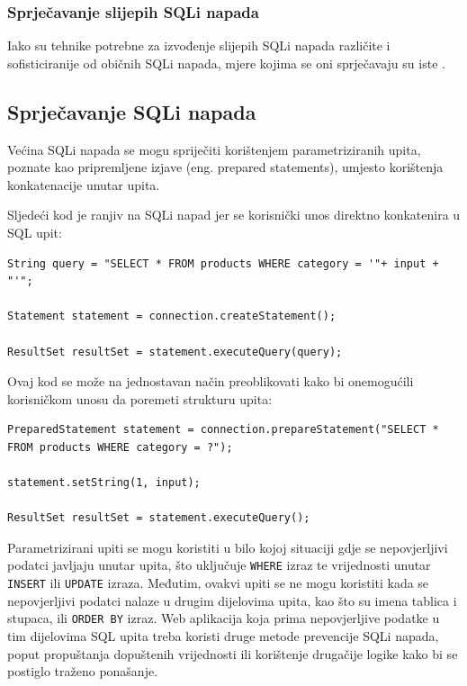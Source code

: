 \documentclass[12pt, oneside, onecolumn]{book}
\begin{document}
{\subsubsection{Sprječavanje slijepih SQLi napada}
Iako su tehnike potrebne za izvođenje slijepih SQLi napada različite i sofisticiranije od običnih SQLi napada, mjere kojima se oni sprječavaju su iste \cite{blndsqli}.

\subsection{Sprječavanje SQLi napada}
Većina SQLi napada se mogu spriječiti korištenjem parametriziranih upita, poznate kao pripremljene izjave (eng. prepared statements), umjesto korištenja konkatenacije unutar upita. 

Sljedeći kod je ranjiv na SQLi napad jer se korisnički unos direktno konkatenira u SQL upit:

\begin{verbatim}
String query = "SELECT * FROM products WHERE category = '"+ input + "'";

Statement statement = connection.createStatement();

ResultSet resultSet = statement.executeQuery(query);
\end{verbatim}

Ovaj kod se može na jednostavan način preoblikovati kako bi onemogućili korisničkom unosu da poremeti strukturu upita:

\begin{verbatim}
PreparedStatement statement = connection.prepareStatement("SELECT * FROM products WHERE category = ?");

statement.setString(1, input);

ResultSet resultSet = statement.executeQuery();
\end{verbatim}

Parametrizirani upiti se mogu koristiti u bilo kojoj situaciji gdje se nepovjerljivi podatci javljaju unutar upita, što uključuje \texttt{WHERE} izraz te vrijednosti unutar \texttt{INSERT} ili \texttt{UPDATE} izraza. Međutim, ovakvi upiti se ne mogu koristiti kada se nepovjerljivi podatci nalaze u drugim dijelovima upita, kao što su imena tablica i stupaca, ili \texttt{ORDER BY} izraz. Web aplikacija koja prima nepovjerljive podatke u tim dijelovima SQL upita treba koristi druge metode prevencije SQLi napada, poput propuštanja dopuštenih vrijednosti ili korištenje drugačije logike kako bi se postiglo traženo ponašanje.

}
\end{document}
